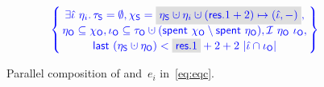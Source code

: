 \begin{figure}
\[{{\begin{array}{c}
~~~~\spec{\!\!
\begin{array}{c}
  \exists \iknh~\gist_i \ldot  
  \tkns = \emptyset\aand \hists = \gbm{\gists \hunion \gist_i \hunion (\res.1 + 2) \hpts (\iknh, -)},\\[1pt]
  \gisto \subseteq \histo\aand \ikno \subseteq \tkno \hunion
  (\Tomb~\histo \setminus \Tomb~\gisto), \Ic{\gisto}{\ikno},\\[1pt]
  \last~(\gists \hunion \gisto)  < \gbm{\res.1} + 2 +
  2~|\iknh \cap \ikno|
%
\end{array}
\!\!} %
%
\end{array}
}}  
\]
%
\caption{Parallel composition of  and~$e_i$ in~\eqref{eq:eqc}.}
  \label{fig:example1} 
\end{figure}
%
%



%
%
%

